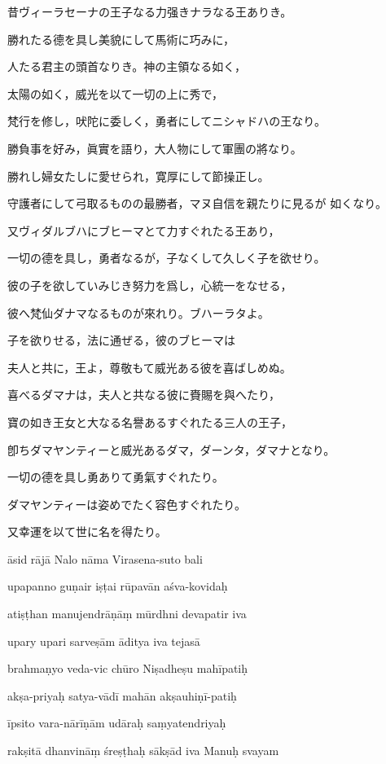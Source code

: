 %
昔ヴィーラセーナの王子なる力强きナラなる王ありき。

勝れたる德を具し美貌にして馬術に巧みに，

人たる君主の頭首なりき。神の主領なる如く，

太陽の如く，威光を以て一切の上に秀で，

梵行を修し，吠陀に委しく，勇者にしてニシャドハの王なり。

勝負事を好み，眞實を語り，大人物にして軍團の將なり。

勝れし婦女たしに愛せられ，寛厚にして節操正し。

守護者にして弓取るものの最勝者，マヌ自信を親たりに見るが
如くなり。

又ヴィダルブハにブヒーマとて力すぐれたる王あり，

一切の德を具し，勇者なるが，子なくして久しく子を欲せり。

彼の子を欲していみじき努力を爲し，心統一をなせる，

彼へ梵仙ダナマなるものが來れり。ブハーラタよ。

子を欲りせる，法に通ぜる，彼のブヒーマは

夫人と共に，王よ，尊敬もて威光ある彼を喜ばしめぬ。

喜べるダマナは，夫人と共なる彼に賚賜を與へたり，

寶の如き王女と大なる名譽あるすぐれたる三人の王子，

卽ちダマヤンティーと威光あるダマ，ダーンタ，ダマナとなり。

一切の德を具し勇ありて勇氣すぐれたり。

ダマヤンティーは姿めでたく容色すぐれたり。

又幸運を以て世に名を得たり。

\newpage{}

āsid rājā Nalo nāma Virasena-suto bali \da

upapanno guṇair iṣṭai rūpavān aśva-kovidaḥ \dd

atiṣṭhan manujendrāṇāṃ mūrdhni devapatir iva \da

upary upari sarveṣām āditya iva tejasā \dd

brahmaṇyo veda-vic chūro Niṣadheṣu mahīpatiḥ \da

akṣa-priyaḥ satya-vādī mahān akṣauhiṇī-patiḥ \dd

īpsito vara-nārīṇām udāraḥ saṃyatendriyaḥ \da

rakṣitā dhanvināṃ śreṣṭhaḥ sākṣād iva Manuḥ svayam \dd


